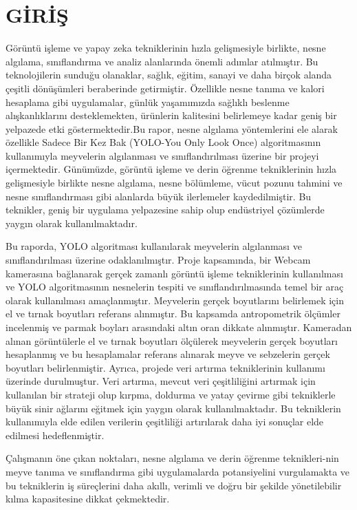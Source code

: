 \documentclass[11pt,a4paper]{report}
\begin{document}
   \section{GİRİŞ}
   \begin{justify}
   	Görüntü işleme ve yapay zeka tekniklerinin hızla gelişmesiyle birlikte, nesne algılama, sınıflandırma ve analiz alanlarında önemli adımlar atılmıştır. Bu teknolojilerin sunduğu olanaklar, sağlık, eğitim, sanayi ve daha birçok alanda çeşitli dönüşümleri beraberinde getirmiştir. Özellikle nesne tanıma ve kalori hesaplama gibi uygulamalar, günlük yaşamımızda sağlıklı beslenme alışkanlıklarını desteklemekten, ürünlerin kalitesini belirlemeye kadar geniş bir yelpazede etki göstermektedir.Bu rapor, nesne algılama yöntemlerini ele alarak özellikle Sadece Bir Kez Bak (YOLO-You Only Look Once) algoritmasının kullanımıyla meyvelerin algılanması ve sınıflandırılması üzerine bir projeyi içermektedir. Günümüzde, görüntü işleme ve derin öğrenme tekniklerinin hızla gelişmesiyle birlikte nesne algılama, nesne bölümleme, vücut pozunu tahmini ve nesne sınıflandırması gibi alanlarda büyük ilerlemeler kaydedilmiştir. Bu teknikler, geniş bir uygulama yelpazesine sahip olup endüstriyel çözümlerde yaygın olarak kullanılmaktadır.
   \newpage
   
   Bu raporda, YOLO algoritması kullanılarak meyvelerin algılanması ve sınıflandırılması üzerine odaklanılmıştır. Proje kapsamında, bir Webcam kamerasına bağlanarak gerçek zamanlı görüntü işleme tekniklerinin kullanılması ve YOLO algoritmasının nesnelerin tespiti ve sınıflandırılmasında temel bir araç olarak kullanılması amaçlanmıştır.
   Meyvelerin gerçek boyutlarını belirlemek için el ve tırnak boyutları referans alınmıştır. Bu kapsamda antropometrik ölçümler incelenmiş ve parmak boyları arasındaki altın oran dikkate alınmıştır. Kameradan alınan görüntülerle el ve tırnak boyutları ölçülerek meyvelerin gerçek boyutları hesaplanmış ve bu hesaplamalar referans alınarak meyve ve sebzelerin gerçek boyutları belirlenmiştir.
   Ayrıca, projede veri artırma tekniklerinin kullanımı üzerinde durulmuştur. Veri artırma, mevcut veri çeşitliliğini artırmak için kullanılan bir strateji olup kırpma, doldurma ve yatay çevirme gibi tekniklerle büyük sinir ağlarını eğitmek için yaygın olarak kullanılmaktadır. Bu tekniklerin kullanımıyla elde edilen verilerin çeşitliliği artırılarak daha iyi sonuçlar elde edilmesi hedeflenmiştir.
   \newline
   
   Çalışmanın öne çıkan noktaları, nesne algılama ve derin öğrenme teknikleri-nin meyve tanıma ve sınıflandırma gibi uygulamalarda potansiyelini vurgulamakta ve bu tekniklerin iş süreçlerini daha akıllı, verimli ve doğru bir şekilde yönetilebilir kılma kapasitesine dikkat çekmektedir.\newline
   
   \end{justify}
 
\end{document}
